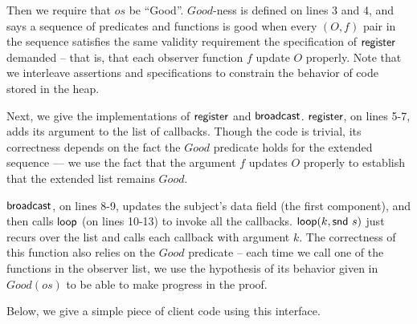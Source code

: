 \documentclass[preprint,natbib]{sigplanconf}
\begin{document}
Then we require that $os$ be ``Good''. $Good$-ness is defined on lines
3 and 4, and says a sequence of predicates and functions is good when
every $(O,f)$ pair in the sequence satisfies the same validity
requirement the specification of $\mbox{\textsf{{register}}}$ demanded -- that
is, that each observer function $f$ update $O$ properly.  Note that we
interleave assertions and specifications to constrain the behavior of
code stored in the heap.

Next, we give the implementations of $\mbox{\textsf{{register}}}$ and
$\mbox{\textsf{{broadcast}}}$. $\mbox{\textsf{{register}}}$, on lines 5-7, adds its
argument to the list of callbacks. Though the code is trivial, its
correctness depends on the fact the $Good$ predicate holds for the
extended sequence --- we use the fact that the argument $f$ updates 
$O$ properly to establish that the extended list remains $Good$. 

$\mbox{\textsf{{broadcast}}}$, on lines 8-9, updates the subject's data field
(the first component), and then calls $\mbox{\textsf{{loop}}}$ (on lines 10-13)
to invoke all the callbacks. $\mbox{\textsf{{loop}}}(k, \mbox{\textsf{{snd }}} s)$ just recurs
over the list and calls each callback with argument $k$. The
correctness of this function also relies on the $Good$ predicate --
each time we call one of the functions in the observer list, we use
the hypothesis of its behavior given in $Good(os)$ to be able to make
progress in the proof.


Below, we give a simple piece of client code using this interface.
\end{document}
